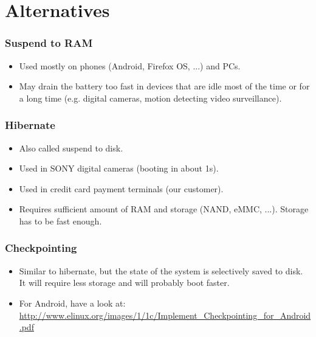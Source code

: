 \section{Alternatives}
\begin{frame}
\frametitle{Suspend to RAM}
\begin{itemize}
\item Used mostly on phones (Android, Firefox OS, ...) and PCs.
\item May drain the battery too fast in devices that are idle most of the time or
      for a long time (e.g. digital cameras, motion detecting video surveillance).
\end{itemize}
\end{frame}

\begin{frame}
\frametitle{Hibernate}
\begin{itemize}
\item Also called suspend to disk.
\item Used in SONY digital cameras (booting in about 1s).
\item Used in credit card payment terminals (our customer).
\item Requires sufficient amount of RAM and storage (NAND, eMMC, ...).
      Storage has to be fast enough.
\end{itemize}
\end{frame}

\begin{frame}
\frametitle{Checkpointing}
\begin{itemize}
\item Similar to hibernate, but the state of the system is selectively saved
      to disk. It will require less storage and will probably boot faster.
\item For Android, have a look at:
      \url{http://www.elinux.org/images/1/1c/Implement_Checkpointing_for_Android.pdf}
\end{itemize}
\end{frame}


